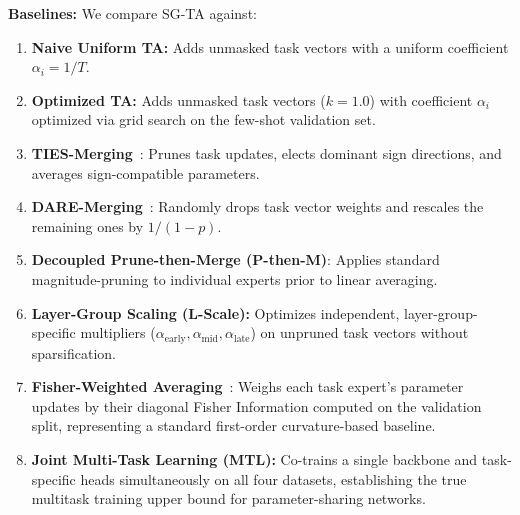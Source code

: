 \textbf{Baselines:} We compare SG-TA against:
\begin{enumerate}
    \item \textbf{Naive Uniform TA:} Adds unmasked task vectors with a uniform coefficient $\alpha_i = 1/T$.
    \item \textbf{Optimized TA:} Adds unmasked task vectors ($k=1.0$) with coefficient $\alpha_i$ optimized via grid search on the few-shot validation set.
    \item \textbf{TIES-Merging}~\cite{yadav2023ties}: Prunes task updates, elects dominant sign directions, and averages sign-compatible parameters.
    \item \textbf{DARE-Merging}~\cite{yu2023language}: Randomly drops task vector weights and rescales the remaining ones by $1/(1-p)$.
    \item \textbf{Decoupled Prune-then-Merge (P-then-M)}: Applies standard magnitude-pruning to individual experts prior to linear averaging.
    \item \textbf{Layer-Group Scaling (L-Scale):} Optimizes independent, layer-group-specific multipliers ($\alpha_{\text{early}}, \alpha_{\text{mid}}, \alpha_{\text{late}}$) on unpruned task vectors without sparsification.
    \item \textbf{Fisher-Weighted Averaging}~\cite{matena2022merging}: Weighs each task expert's parameter updates by their diagonal Fisher Information computed on the validation split, representing a standard first-order curvature-based baseline.
    \item \textbf{Joint Multi-Task Learning (MTL):} Co-trains a single backbone and task-specific heads simultaneously on all four datasets, establishing the true multitask training upper bound for parameter-sharing networks.
\end{enumerate}


